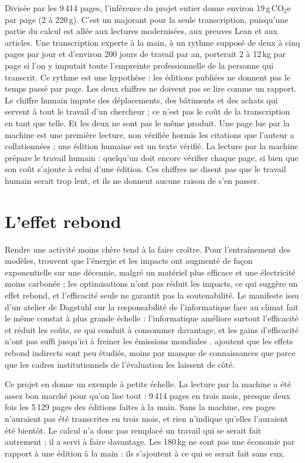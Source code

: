 \documentclass[11pt,a4paper]{article}
\begin{document}
Divisée par les 9\,414 pages, l'inférence du projet entier donne environ 19\,g\,CO$_2$e par page (2 à 220\,g). C'est un majorant pour la seule transcription, puisqu'une partie du calcul est allée aux lectures modernisées, aux preuves Lean et aux articles. Une transcription experte à la main, à un rythme supposé de deux à cinq pages par jour et d'environ 200 jours de travail par an, porterait 2 à 12\,kg par page si l'on y imputait toute l'empreinte professionnelle de la personne qui transcrit. Ce rythme est une hypothèse : les éditions publiées ne donnent pas le temps passé par page. Les deux chiffres ne doivent pas se lire comme un rapport. Le chiffre humain impute des déplacements, des bâtiments et des achats qui servent à tout le travail d'un chercheur ; ce n'est pas le coût de la transcription en tant que telle. Et les deux ne sont pas le même produit. Une page lue par la machine est une première lecture, non vérifiée hormis les citations que l'auteur a collationnées ; une édition humaine est un texte vérifié. La lecture par la machine prépare le travail humain : quelqu'un doit encore vérifier chaque page, si bien que son coût s'ajoute à celui d'une édition. Ces chiffres ne disent pas que le travail humain serait trop lent, et ils ne donnent aucune raison de s'en passer.

\section{L'effet rebond}

Rendre une activité moins chère tend à la faire croître. Pour l'entraînement des modèles, \citet{morand2026} trouvent que l'énergie et les impacts ont augmenté de façon exponentielle sur une décennie, malgré un matériel plus efficace et une électricité moins carbonée ; les optimisations n'ont pas réduit les impacts, ce qui suggère un effet rebond, et l'efficacité seule ne garantit pas la soutenabilité. Le manifeste issu d'un atelier de Dagstuhl sur la responsabilité de l'informatique face au climat fait le même constat à plus grande échelle : l'informatique améliore surtout l'efficacité et réduit les coûts, ce qui conduit à consommer davantage, et les gains d'efficacité n'ont pas suffi jusqu'ici à freiner les émissions mondiales \citep{knowles2025}. \citet{lacroux2026} ajoutent que les effets rebond indirects sont peu étudiés, moins par manque de connaissances que parce que les cadres institutionnels de l'évaluation les laissent de côté.

Ce projet en donne un exemple à petite échelle. La lecture par la machine a été assez bon marché pour qu'on lise tout : 9\,414 pages en trois mois, presque deux fois les 5\,129 pages des éditions faites à la main. Sans la machine, ces pages n'auraient pas été transcrites en trois mois, et rien n'indique qu'elles l'auraient été bientôt. Le calcul n'a donc pas remplacé un travail qui se serait fait autrement ; il a servi à faire davantage. Les 180\,kg ne sont pas une économie par rapport à une édition à la main : ils s'ajoutent à ce qui se serait fait sans eux.
\end{document}

